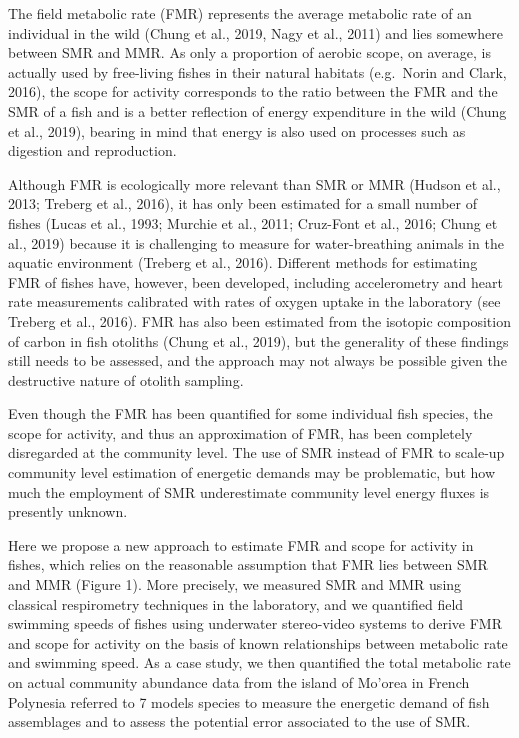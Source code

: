 \documentclass[12pt,a4paper]{article}
\begin{document}
\noindent The field metabolic rate (FMR) represents the average
metabolic rate of an individual in the wild (Chung et al., 2019, Nagy et
al., 2011) and lies somewhere between SMR and MMR. As only a proportion
of aerobic scope, on average, is actually used by free-living fishes in
their natural habitats (e.g.~Norin and Clark, 2016), the scope for
activity corresponds to the ratio between the FMR and the SMR of a fish
and is a better reflection of energy expenditure in the wild (Chung et
al., 2019), bearing in mind that energy is also used on processes such
as digestion and reproduction.

\noindent Although FMR is ecologically more relevant than SMR or MMR
(Hudson et al., 2013; Treberg et al., 2016), it has only been estimated
for a small number of fishes (Lucas et al., 1993; Murchie et al., 2011;
Cruz-Font et al., 2016; Chung et al., 2019) because it is challenging to
measure for water-breathing animals in the aquatic environment (Treberg
et al., 2016). Different methods for estimating FMR of fishes have,
however, been developed, including accelerometry and heart rate
measurements calibrated with rates of oxygen uptake in the laboratory
(see Treberg et al., 2016). FMR has also been estimated from the
isotopic composition of carbon in fish otoliths (Chung et al., 2019),
but the generality of these findings still needs to be assessed, and the
approach may not always be possible given the destructive nature of
otolith sampling.

\noindent Even though the FMR has been quantified for some individual
fish species, the scope for activity, and thus an approximation of FMR,
has been completely disregarded at the community level. The use of SMR
instead of FMR to scale-up community level estimation of energetic
demands may be problematic, but how much the employment of SMR
underestimate community level energy fluxes is presently unknown.

\noindent Here we propose a new approach to estimate FMR and scope for
activity in fishes, which relies on the reasonable assumption that FMR
lies between SMR and MMR (Figure 1). More precisely, we measured SMR and
MMR using classical respirometry techniques in the laboratory, and we
quantified field swimming speeds of fishes using underwater stereo-video
systems to derive FMR and scope for activity on the basis of known
relationships between metabolic rate and swimming speed. As a case
study, we then quantified the total metabolic rate on actual community
abundance data from the island of Mo'orea in French Polynesia referred
to 7 models species to measure the energetic demand of fish assemblages
and to assess the potential error associated to the use of SMR.
\end{document}
